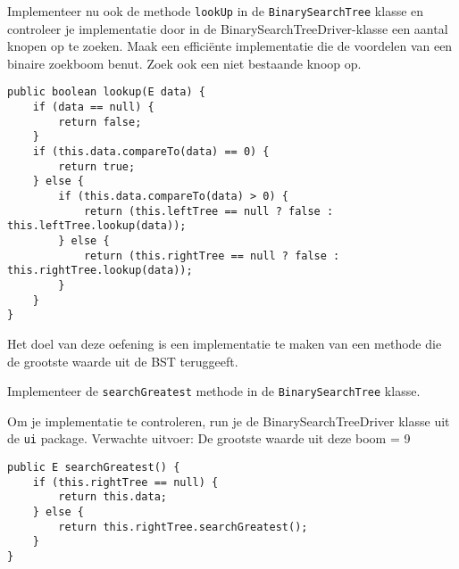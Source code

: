 \begin{oef}
\code Implementeer nu ook de methode \verb=lookUp= in de \verb=BinarySearchTree= klasse en controleer je implementatie door in de BinarySearchTreeDriver-klasse een aantal knopen op te zoeken. Maak een efficiënte implementatie die de voordelen van een binaire zoekboom benut. Zoek ook een niet bestaande knoop op.
\begin{opl}
\begin{lstlisting}[caption={lookUp(data) methode}, label=bstlookUp]
public boolean lookup(E data) {
	if (data == null) {
		return false;
	}
	if (this.data.compareTo(data) == 0) {
		return true;
	} else {
		if (this.data.compareTo(data) > 0) {
			return (this.leftTree == null ? false : this.leftTree.lookup(data));
		} else {
			return (this.rightTree == null ? false : this.rightTree.lookup(data));
		}
	}
}
\end{lstlisting}
\end{opl}
	
\end{oef}





\begin{oef}
\code Het doel van deze oefening is een implementatie te maken van een methode die de grootste waarde uit de BST teruggeeft.
\begin{oefenumerate}
	\item Implementeer de \verb=searchGreatest= methode in de \verb=BinarySearchTree= klasse. 
	\item Om je implementatie te controleren, run je de BinarySearchTreeDriver klasse uit de \verb+ui+ package. Verwachte uitvoer: De grootste waarde uit deze boom = 9 
\end{oefenumerate}
\begin{opl}
\begin{lstlisting}[caption={searchGreatest methode}, label=bstsearchgreatest]
public E searchGreatest() {
	if (this.rightTree == null) {
		return this.data;
	} else {
		return this.rightTree.searchGreatest();
	}
}
 \end{lstlisting}

\end{opl}
\end{oef}




